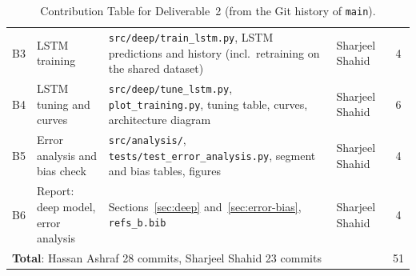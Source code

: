 \begin{table}[H]
\begin{tabular}{p{0.8cm}p{3.1cm}p{6.3cm}p{2.5cm}c}
    B3 & LSTM training & \texttt{src/deep/train\_lstm.py}, LSTM predictions and history (incl.\ retraining on the shared dataset) & Sharjeel Shahid & 4 \\
    B4 & LSTM tuning and curves & \texttt{src/deep/tune\_lstm.py}, \texttt{plot\_training.py}, tuning table, curves, architecture diagram & Sharjeel Shahid & 6 \\
    B5 & Error analysis and bias check & \texttt{src/analysis/}, \texttt{tests/test\_error\_analysis.py}, segment and bias tables, figures & Sharjeel Shahid & 4 \\
    B6 & Report: deep model, error analysis & Sections~\ref{sec:deep} and~\ref{sec:error-bias}, \texttt{refs\_b.bib} & Sharjeel Shahid & 4 \\
    \midrule
    \multicolumn{4}{l}{\textbf{Total}: Hassan Ashraf 28 commits, Sharjeel Shahid 23 commits} & 51 \\
    \bottomrule
  \end{tabular}
  \caption{Contribution Table for Deliverable~2 (from the Git history of \texttt{main}).}
  \label{tab:contributions}
\end{table}
